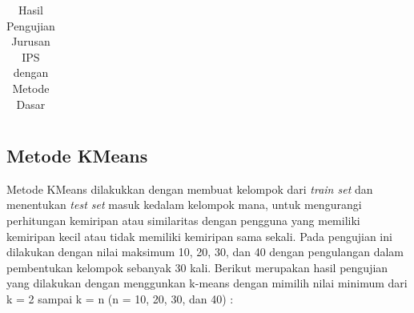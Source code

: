 \begin{enumerate}
\begin{longtable}[H]{|c|c|c|c|}
            \caption{Hasil Pengujian Jurusan IPS dengan Metode Dasar}
            \label{tab:pengujian ips dasar}
        \end{longtable}
        
\end{enumerate}

\subsection{Metode KMeans}
\label{subsec: metode kmeans}

Metode KMeans dilakukkan dengan membuat kelompok dari \textit{train set} dan menentukan \textit{test set} masuk kedalam kelompok mana, untuk mengurangi perhitungan kemiripan atau similaritas dengan pengguna yang memiliki kemiripan kecil atau tidak memiliki kemiripan sama sekali. Pada pengujian ini dilakukan dengan nilai maksimum 10, 20, 30, dan 40 dengan pengulangan dalam pembentukan kelompok sebanyak 30 kali. Berikut merupakan hasil pengujian yang dilakukan dengan menggunkan k-means dengan mimilih nilai minimum dari k = 2 sampai k = n (n = 10, 20, 30, dan 40) :


